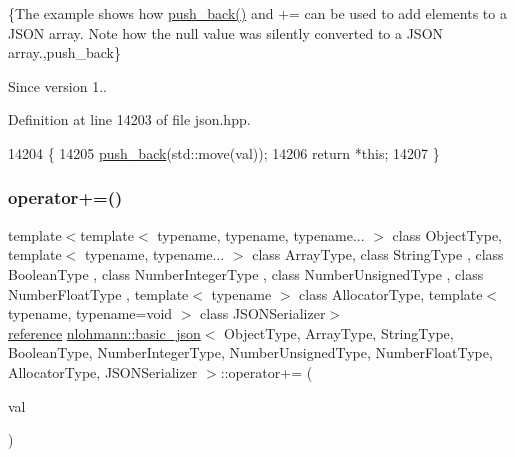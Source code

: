 \{The example shows how {\ttfamily \hyperlink{classnlohmann_1_1basic__json_ac8e523ddc8c2dd7e5d2daf0d49a9c0d7}{push\+\_\+back()}} and {\ttfamily +=} can be used to add elements to a J\+S\+ON array. Note how the {\ttfamily null} value was silently converted to a J\+S\+ON array.,push\+\_\+back\}

\begin{DoxySince}{Since}
version 1.. 
\end{DoxySince}


Definition at line 14203 of file json.\+hpp.


\begin{DoxyCode}
14204     \{
14205         \hyperlink{classnlohmann_1_1basic__json_ac8e523ddc8c2dd7e5d2daf0d49a9c0d7}{push\_back}(std::move(val));
14206         \textcolor{keywordflow}{return} *\textcolor{keyword}{this};
14207     \}
\end{DoxyCode}
\mbox{\label{classnlohmann_1_1basic__json_adc29dd6358ff7a9062d7e168c24e7484}} 
\subsubsection{\texorpdfstring{operator+=()}{operator+=()}\hspace{0.1cm}{\footnotesize\ttfamily [2/4]}}
{\footnotesize\ttfamily template$<$template$<$ typename, typename, typename... $>$ class Object\+Type, template$<$ typename, typename... $>$ class Array\+Type, class String\+Type , class Boolean\+Type , class Number\+Integer\+Type , class Number\+Unsigned\+Type , class Number\+Float\+Type , template$<$ typename $>$ class Allocator\+Type, template$<$ typename, typename=void $>$ class J\+S\+O\+N\+Serializer$>$ \\
\hyperlink{classnlohmann_1_1basic__json_ac6a5eddd156c776ac75ff54cfe54a5bc}{reference} \hyperlink{classnlohmann_1_1basic__json}{nlohmann\+::basic\+\_\+json}$<$ Object\+Type, Array\+Type, String\+Type, Boolean\+Type, Number\+Integer\+Type, Number\+Unsigned\+Type, Number\+Float\+Type, Allocator\+Type, J\+S\+O\+N\+Serializer $>$\+::operator+= (\begin{DoxyParamCaption}\item[{const \hyperlink{classnlohmann_1_1basic__json}{basic\+\_\+json}$<$ Object\+Type, Array\+Type, String\+Type, Boolean\+Type, Number\+Integer\+Type, Number\+Unsigned\+Type, Number\+Float\+Type, Allocator\+Type, J\+S\+O\+N\+Serializer $>$ \&}]{val }\end{DoxyParamCaption})\hspace{0.3cm}{\ttfamily [inline]}}



